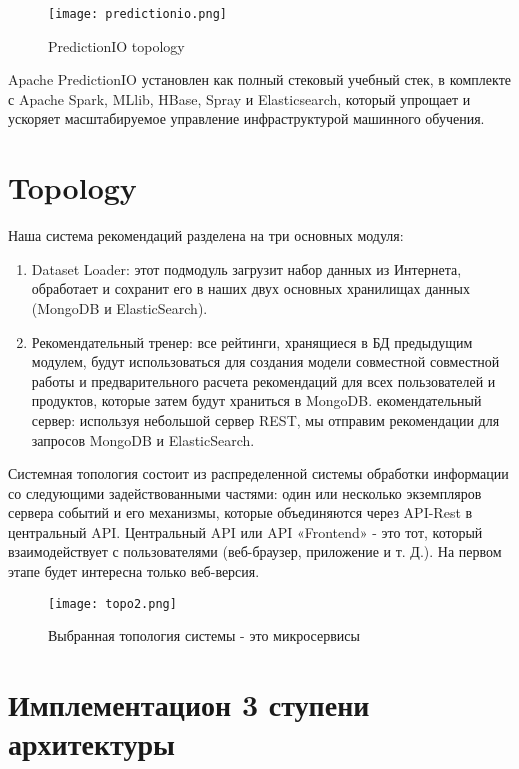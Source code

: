 \begin{figure}[h]
  \centering
  \texttt{[image: predictionio.png]}
  \caption{PredictionIO topology}
  \label{image:alg_timer}
\end{figure}

Apache PredictionIO установлен как полный стековый учебный стек, в комплекте с Apache Spark, MLlib, HBase, Spray и Elasticsearch, который упрощает и ускоряет масштабируемое управление инфраструктурой машинного обучения.

\newpage
\section{Topology}

Наша система рекомендаций разделена на три основных модуля:

\begin{enumerate}
\item Dataset Loader: этот подмодуль загрузит набор данных из Интернета, обработает и сохранит его в наших двух основных хранилищах данных (MongoDB и ElasticSearch).
\item Рекомендательный тренер: все рейтинги, хранящиеся в БД предыдущим модулем, будут использоваться для создания модели совместной совместной работы и предварительного расчета рекомендаций для всех пользователей и продуктов, которые затем будут храниться в MongoDB.
 екомендательный сервер: используя небольшой сервер REST, мы отправим рекомендации для запросов MongoDB и ElasticSearch.
	
\end{enumerate}

Системная топология состоит из распределенной системы обработки информации со следующими задействованными частями: один или несколько экземпляров сервера событий и его механизмы, которые объединяются через API-Rest в центральный API. Центральный API или API «Frontend» - это тот, который взаимодействует с пользователями (веб-браузер, приложение и т. Д.). На первом этапе будет интересна только веб-версия.

\begin{figure}[h]
  \centering
  \texttt{[image: topo2.png]}
  \caption{Выбранная топология системы - это микросервисы}
  \label{image:alg_timer2}
\end{figure}


\section{Имплементацион 3 ступени архитектуры}


